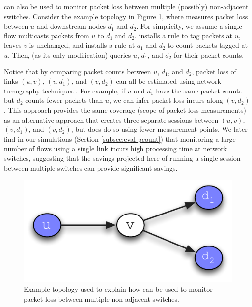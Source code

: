 \pcnt can also be used to monitor packet loss between multiple (possibly) non-adjacent switches. Consider the example topology in Figure \ref{fig:pcount-multipoint}, where \pcnt measures
packet loss between $u$ and downstream nodes $d_1$ and $d_2$. For simplicity, we assume a single flow multicasts packets from $u$ to $d_1$ and $d_2$. \pcnt installs 
a rule to tag packets at $u$, leaves $v$ is unchanged, and installs a rule at $d_1$ and $d_2$ to count packets tagged at $u$. Then, \pcnt (as its only modification) queries $u$, $d_1$, and $d_2$
for their packet counts.

Notice that by comparing packet counts between $u$, $d_1$, and $d_2$, packet loss of links $(u,v)$, $(v,d_1)$, and $(v,d_2)$ can all be estimated using network tomography techniques \cite{Bu02}.
For example, if $u$ and $d_1$ have the same
packet counts but $d_2$ counts fewer packets than $u$, we can infer packet loss incurs along $(v,d_2)$.  This approach provides the same coverage (scope of packet loss measurements) as an alternative
approach that creates three separate \pcnt sessions between $(u,v)$, $(v,d_1)$, and $(v,d_2)$, but does do so using fewer measurement points. 
We later find in our simulations (Section \ref{subsec:eval-pcount}) that monitoring a large number of flows
using a single link incurs high processing time at network switches, suggesting that the savings projected here of running a single \pcnt session between multiple switches can provide 
significant savings. 

\begin{figure}
  \centering
   \includegraphics[scale=0.75]{figs/multicast/pcount-multipoint.pdf}
\caption{Example topology used to explain how \pcnt can be used to monitor packet loss between multiple non-adjacent switches.}
\label{fig:pcount-multipoint}
\end{figure}



